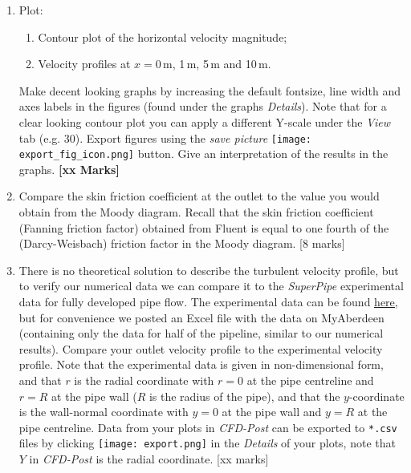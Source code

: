 \documentclass[11pt,a4paper,oneside]{scrartcl}
\begin{document}
\begin{enumerate}
\item Plot:
  \begin{enumerate}
    \item Contour plot of the horizontal velocity magnitude;
    \item Velocity profiles at $x=0$\,m, 1\,m, 5\,m and 10\,m.
  \end{enumerate}
  Make decent looking graphs by increasing the default fontsize, line width and axes labels in the figures (found under the graphs \emph{Details}). Note that for a clear looking contour plot you can apply a different Y-scale under the \emph{View} tab (e.g. 30). Export figures using the \emph{save picture} \texttt{[image: export\_fig\_icon.png]} button. Give an interpretation of the results in the graphs. {\bf [xx Marks]}
\item Compare the skin friction coefficient at the outlet to the value you would obtain from the Moody diagram. Recall that the skin friction coefficient (Fanning friction factor) obtained from Fluent is equal to one fourth of the (Darcy-Weisbach) friction factor in the Moody diagram. [8 marks]
\item There is no theoretical solution to describe the turbulent velocity profile, but to verify our numerical data we can compare it to the \emph{SuperPipe} experimental data for fully developed pipe flow. The experimental data can be found  \href{http://www.princeton.edu/~gasdyn/Superpipe_data/3.1577E+04.txt}{\underline{here}}, but for convenience we posted an Excel file with the data on MyAberdeen (containing only the data for half of the pipeline, similar to our numerical results). Compare your outlet velocity profile to the experimental velocity profile. Note that the experimental data is given in non-dimensional form, and that $r$ is the radial coordinate with $r=0$ at the pipe centreline and $r=R$ at the pipe wall ($R$ is the radius of the pipe), and that the $y$-coordinate is the wall-normal coordinate with $y=0$ at the pipe wall and $y=R$ at the pipe centreline. Data from your plots in \emph{CFD-Post} can be exported to \texttt{*.csv} files by clicking \texttt{[image: export.png]} in the \emph{Details} of your plots, note that $Y$ in \emph{CFD-Post} is the radial coordinate. [xx marks]
\end{enumerate}
\end{document}
